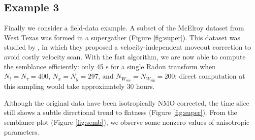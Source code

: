 



\subsection{Example 3}

Finally we consider a field-data example. A subset of the McElroy dataset from West Texas was formed in a supergather (Figure \ref{fig:super}). This dataset was studied by \cite{BF09}, in which they proposed a velocity-independent moveout correction to avoid costly velocity scan. With the fast algorithm, we are now able to compute the semblance efficiently: only 45 s for a single Radon transform when $N_t=N_{\tau}=400$, $N_x=N_y=297$, and $N_{W_{\cos}}=N_{W_{\sin}}=200$; direct computation at this sampling would take approximately 30 hours. 

Although the original data have been isotropically NMO corrected, the time slice still shows a subtle directional trend to flatness (Figure \ref{fig:super}). From the semblance plot (Figure \ref{fig:semb}), we observe some nonzero values of anisotropic parameters. %





